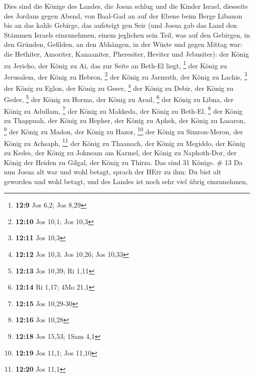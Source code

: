  Dies sind die Könige des Landes, die Josua schlug und die
Kinder Israel, diesseits des Jordans gegen Abend, von Baal-Gad an auf
der Ebene beim Berge Libanon bis an das kahle Gebirge, das aufsteigt gen
Seir (und Josua gab das Land den Stämmen Israels einzunehmen, einem
jeglichen sein Teil,  was auf den Gebirgen, in den Gründen,
Gefilden, an den Abhängen, in der Wüste und gegen Mittag war: die
Hethiter, Amoriter, Kanaaniter, Pheresiter, Heviter und Jebusiter):
 der König zu Jericho, der König zu Ai, das zur Seite an
Beth-El liegt, \footnote{\textbf{12:9} Jos 6,2; Jos 8,29} 
der König zu Jerusalem, der König zu Hebron, \footnote{\textbf{12:10}
  Jos 10,1; Jos 10,3}  der König zu Jarmuth, der König zu
Lachis, \footnote{\textbf{12:11} Jos 10,3}  der König zu
Eglon, der König zu Geser, \footnote{\textbf{12:12} Jos 10,3; Jos 10,26;
  Jos 10,33}  der König zu Debir, der König zu Geder,
\footnote{\textbf{12:13} Jos 10,39; Ri 1,11}  der König zu
Horma, der König zu Arad, \footnote{\textbf{12:14} Ri 1,17; 4Mo 21,1}
 der König zu Libna, der König zu Adullam, \footnote{\textbf{12:15}
  Jos 10,29-30}  der König zu Makkeda, der König zu
Beth-El, \footnote{\textbf{12:16} Jos 10,28}  der König zu
Thappuah, der König zu Hepher,  der König zu Aphek, der
König zu Lasaron, \footnote{\textbf{12:18} Jos 15,53; 1Sam 4,1}
 der König zu Madon, der König zu Hazor, \footnote{\textbf{12:19}
  Jos 11,1; Jos 11,10}  der König zu Simron-Meron, der
König zu Achsaph, \footnote{\textbf{12:20} Jos 11,1}  der
König zu Thaanach, der König zu Megiddo,  der König zu
Kedes, der König zu Jokneam am Karmel,  der König zu
Naphoth-Dor, der König der Heiden zu Gilgal,  der König zu
Thirza. Das sind 31 Könige. \# 13  Da nun Josua alt war und
wohl betagt, sprach der HErr zu ihm: Du bist alt geworden und wohl
betagt, und des Landes ist noch sehr viel übrig einzunehmen,

